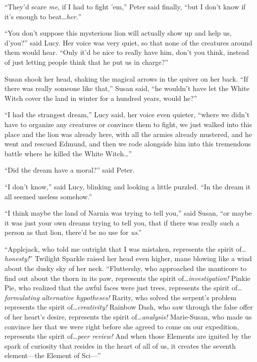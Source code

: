“They’d scare \emph{me}, if I had to fight ’em,” Peter said finally, “but I don’t know if it’s enough to beat…\emph{her.}”

“You don’t suppose this mysterious lion will actually show up and help us, d’you?” said Lucy. Her voice was very quiet, so that none of the creatures around them would hear. “Only it’d be nice to really have him, don’t you think, instead of just letting people think that he put us in charge?”

Susan shook her head, shaking the magical arrows in the quiver on her back. “If there was really someone like that,” Susan said, “he wouldn’t have let the White Witch cover the land in winter for a hundred years, would he?”

“I had the strangest dream,” Lucy said, her voice even quieter, “where we didn’t have to organize any creatures or convince them to fight, we just walked into this place and the lion was already here, with all the armies already mustered, and he went and rescued Edmund, and then we rode alongside him into this tremendous battle where he killed the White Witch…”

“Did the dream have a moral?” said Peter.

“I don’t know,” said Lucy, blinking and looking a little puzzled. “In the dream it all seemed useless somehow.”

“I think maybe the land of Narnia was trying to tell you,” said Susan, “or maybe it was just your own dreams trying to tell you, that if there was really such a person as that lion, there’d be no use for \emph{us}.”


“Applejack, who told me outright that I was mistaken, represents the spirit of…\emph{honesty!}” Twilight Sparkle raised her head even higher, mane blowing like a wind about the dusky sky of her neck. “Fluttershy, who approached the manticore to find out about the thorn in its paw, represents the spirit of…\emph{investigation!} Pinkie Pie, who realized that the awful faces were just trees, represents the spirit of…\emph{formulating alternative hypotheses!} Rarity, who solved the serpent’s problem represents the spirit of…\emph{creativity!} Rainbow Dash, who saw through the false offer of her heart’s desire, represents the spirit of…\emph{analysis!} Marie-Susan, who made us convince her that we were right before she agreed to come on our expedition, represents the spirit of…\emph{peer review!} And when those Elements are ignited by the spark of curiosity that resides in the heart of all of us, it creates the seventh element—the Element of Sci—”

